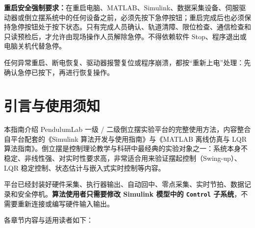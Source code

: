 \documentclass[12pt,a4paper]{article}
\begin{document}
\newpage
\begin{dangerbox}
    \textbf{重启安全强制要求：}在重启电脑、MATLAB、Simulink、数据采集设备、伺服驱动器或倒立摆系统中的任何设备之前，必须先按下急停按钮；重启完成后也必须保持急停按钮处于按下状态。只有完成人员确认、轨道清障、限位检查、通信检查和只读预检后，才允许由现场操作人员解除急停。不得依赖软件 Stop、程序退出或电脑关机代替急停。
\end{dangerbox}

\begin{warnbox}
    任何异常重启、断电恢复、驱动器报警复位或程序崩溃，都按“重新上电”处理：先确认急停已按下，再进行恢复操作。
\end{warnbox}

\newpage
{}
\setcounter{tocdepth}{2}
{\hypersetup{linkcolor=accent}\tableofcontents}
\newpage
{}

\section{引言与使用须知}
\label{sec:intro}

本指南介绍 PendulumLab 一级 / 二级倒立摆实验平台的完整使用方法，内容整合自平台配套的《Simulink 算法开发与使用指南》与《MATLAB 离线仿真与 LQR 算法指南》。倒立摆是控制理论教学与科研中最经典的实验对象之一：系统本身不稳定、非线性强、对实时性要求高，非常适合用来验证摆起控制（Swing-up）、LQR 稳定控制、状态估计与嵌入式实时控制等内容。

\begin{infobox}
    平台已经封装好硬件采集、执行器输出、自动回中、零点采集、实时节拍、数据记录和安全停机。\textbf{算法使用者只需要修改 Simulink 模型中的 \texttt{Control} 子系统}，不需要重新连接或编写硬件输入输出。
\end{infobox}

各章节内容与适用读者如下：
\end{document}
